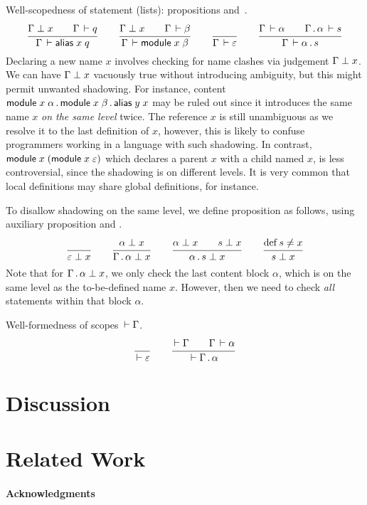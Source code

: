 \documentclass{article}
\theoremstyle{definition}
\theoremstyle{plain}
\theoremstyle{remark}
\begin{document}
Well-scopedness of statement (lists): propositions
  and
\fbox{$\WContent \Gamma \alpha$}\,.
\begin{gather*}
  \ru{\NoClash \Gamma x \qquad \Declares \Gamma q
    }{\WContent \Gamma {\malias x q}}
\qquad
  \ru{\NoClash \Gamma x \qquad \WContent \Gamma \beta
    }{\WContent \Gamma {\mdef x \beta}
    }
\qquad
  \ru{}{\WContent \Gamma \Ge}
\qquad
  \ru{\WContent \Gamma \alpha \qquad
      \WContent {\Gamma \sep \alpha} s
    }{\WContent \Gamma {\alpha \sep s}
    }
\end{gather*}
Declaring a new name $x$ involves checking for name clashes via judgement
$\Gamma \perp x$.  We can have $\Gamma \perp x$ vacuously true
without introducing ambiguity, but this might permit unwanted
shadowing.
For instance, content $\mathsf{module}\;x\;\alpha \,.\, \mathsf{module}\;x\;\beta \,.\, \mathsf{alias}\;y\;x$ may be ruled out
since it introduces the same name $x$ \emph{on the same level} twice.
The reference $x$ is still unambiguous as we resolve it to the last
definition of $x$, however, this is likely to confuse programmers
working in a language with such shadowing.
In contrast, $\mathsf{module}\;x\;(\mathsf{module}\;x\;\varepsilon)$ which declares a
parent $x$ with a child named $x$, is less controversial, since the
shadowing is on different levels.  It is very common that local
definitions may share global definitions, for instance.

To disallow shadowing on the same level, we define proposition
 as follows, using auxiliary proposition
 and
.
\begin{gather*}
  \ru{}{\NoClash \Ge x}
\qquad
  \ru{\NoClash \alpha x
    }{\NoClash {\Gamma \sep \alpha} x}
\qquad
  \ru{\NoClash \alpha x \qquad \NoClash s x
    }{\NoClash {\alpha \sep s} x}
\qquad
  \ru{\defined s \not= x
    }{\NoClash s x}
\end{gather*}
Note that for $\Gamma \,.\, \alpha \perp x$,
we only check the last content block $\alpha$,
which is on the same level as the to-be-defined name $x$.
However, then we need to check \emph{all} statements within that block
$\alpha$.

Well-formedness of scopes $\,\vdash\Gamma$.
\begin{gather*}
  \ru{}{\WScope \Ge}
\qquad
  \ru{\WScope \Gamma \qquad \WContent \Gamma \alpha
    }{\WScope {\Gamma \sep \alpha}}
\end{gather*}

\section{Discussion}

\section{Related Work}

\paragraph*{Acknowledgments}



\end{document}

